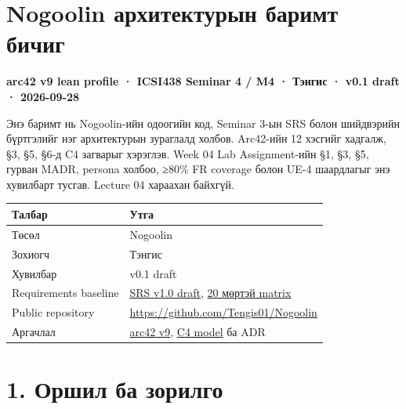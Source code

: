 \documentclass[
  mongolian,
]{article}
\author{}
\date{}
\begin{document}


\section{Nogoolin архитектурын баримт
бичиг}\label{nogoolin-ux430ux440ux445ux438ux442ux435ux43aux442ux443ux440ux44bux43d-ux431ux430ux440ux438ux43cux442-ux431ux438ux447ux438ux433}

\textbf{arc42 v9 lean profile · ICSI438 Seminar 4 / M4 · Тэнгис · v0.1
draft · 2026-09-28}

Энэ баримт нь Nogoolin-ийн одоогийн код, Seminar 3-ын SRS болон
шийдвэрийн бүртгэлийг нэг архитектурын зураглалд холбов. Arc42-ийн 12
хэсгийг хадгалж, §3, §5, §6-д C4 загварыг хэрэглэв. Week 04 Lab
Assignment-ийн §1, §3, §5, гурван MADR, persona холбоо, ≥80\% FR
coverage болон UE-4 шаардлагыг энэ хувилбарт тусгав. Lecture 04 хараахан
байхгүй.

\begin{longtable}[]{@{}
  >{\raggedright\arraybackslash}p{}
  >{\raggedright\arraybackslash}p{}@{}}
\toprule\noalign{}
\begin{minipage}[b]{\linewidth}\raggedright
Талбар
\end{minipage} & \begin{minipage}[b]{\linewidth}\raggedright
Утга
\end{minipage} \\
\midrule\noalign{}
\endhead
\bottomrule\noalign{}
\endlastfoot
Төсөл & Nogoolin \\
Зохиогч & Тэнгис \\
Хувилбар & v0.1 draft \\
Requirements baseline &
\href{https://github.com/Tengis01/Nogoolin/blob/main/docs/requirements/srs-v1.0.md}{SRS
v1.0 draft},
\href{https://github.com/Tengis01/Nogoolin/blob/main/docs/requirements/traceability-matrix-v1.0.md}{20
мөртэй matrix} \\
Public repository & \url{https://github.com/Tengis01/Nogoolin} \\
Аргачлал & \href{https://arc42.org/download/}{arc42 v9},
\href{https://c4model.com/}{C4 model} ба ADR \\
\end{longtable}

\section{1. Оршил ба
зорилго}\label{ux43eux440ux448ux438ux43b-ux431ux430-ux437ux43eux440ux438ux43bux433ux43e}
\end{document}
